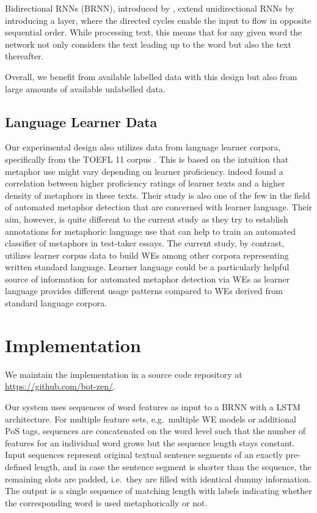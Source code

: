 \documentclass[11pt,a4paper]{article}
\begin{document}
Bidirectional RNNs (BRNN), introduced by , extend unidirectional RNNs by introducing a layer, where the directed cycles enable the input to flow in opposite sequential order. 
While processing text, this means that for any given word the network not only considers the text leading up to the word but also the text thereafter.

Overall, we benefit from available labelled data with this design but
also from large amounts of available unlabelled data.


\subsection{Language Learner Data} %

Our experimental design also utilizes data from language learner corpora, specifically from the TOEFL 11 corpus \cite{ETS2:ETS202331}. This is based on the intuition that metaphor use might vary depending on learner proficiency.
indeed found a correlation between higher proficiency ratings of learner texts and a higher density of metaphors in these texts. Their study is also one of the few in the field of automated metaphor detection that are concerned with learner language. Their aim, however, is quite different to the current study as they try to establish annotations for metaphoric language use that can help to train an automated classifier of metaphors in test-taker essays. The current study, by contrast, utilizes learner corpus data to build WEs among other corpora representing written standard language. Learner language could be a particularly helpful source of information for automated metaphor detection via WEs as learner language provides different usage patterns compared to WEs derived from standard language corpora.


\section{Implementation} %
\label{sec:implementation}

We maintain the implementation in a source code repository at \url{https://github.com/bot-zen/}.  

Our system uses sequences of word features as input to a BRNN with a LSTM architecture.
For multiple feature sets, e.g.~multiple WE models or additional PoS tags, sequences are concatenated on the word level such that the number of features for an individual word grows but the sequence length stays constant.
Input sequences represent original textual sentence segments of an exactly pre-defined length, and in case the sentence segment is shorter than the sequence, the remaining slots are padded, i.e.~they are filled with identical dummy information.
The output is a single sequence of matching length with labels indicating whether the corresponding word is used metaphorically or not.
\end{document}
